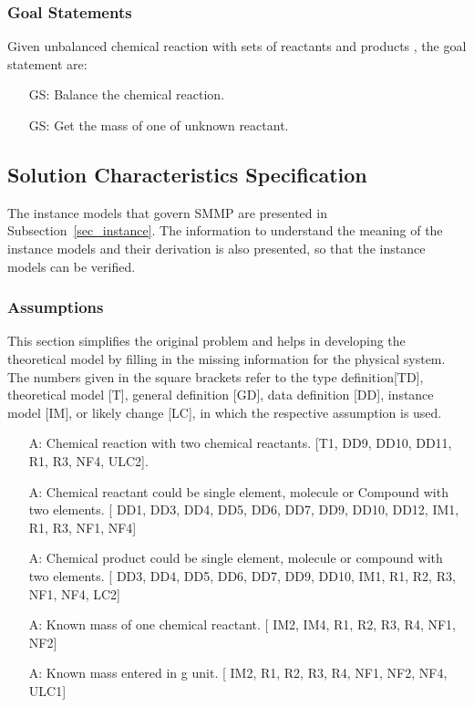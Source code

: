 \documentclass[12pt]{article}
\newcounter{assumpnum} %
\newcounter{goalnum} %
\begin{document}
\subsubsection{Goal Statements}\label{goals}

\noindent Given unbalanced chemical reaction with sets of reactants and products , the goal statement are:

\begin{itemize}
\item[GS\refstepcounter{goalnum}\thegoalnum \label{G1}:] Balance the chemical reaction.
\item[GS\refstepcounter{goalnum}\thegoalnum \label{G2}:] Get the mass of one of unknown reactant.
\end{itemize}

\subsection{Solution Characteristics Specification}


The instance models that govern SMMP are presented in
Subsection~\ref{sec_instance}.  The information to understand the meaning of the
instance models and their derivation is also presented, so that the instance
models can be verified.

\subsubsection{Assumptions} \label{sec_assumpt}

This section simplifies the original problem and helps in developing the
theoretical model by filling in the missing information for the physical
system. The numbers given in the square brackets refer to the  type definition[TD], theoretical model
[T], general definition [GD], data definition [DD], instance model [IM], or
likely change [LC], in which the respective assumption is used.

\begin{itemize}

\item[A\refstepcounter{assumpnum}\theassumpnum \label{Two reactants}:] Chemical reaction with two chemical reactants.  
[T1, DD9, DD10, DD11, R1, R3, NF4, ULC2].
\item[A\refstepcounter{assumpnum}\theassumpnum \label{reactant compound}:] Chemical reactant could be single element, 
molecule or Compound with two elements. [ DD1, DD3, DD4, DD5, DD6, DD7, DD9, DD10, DD12, IM1, R1, R3, NF1, NF4]
\item[A\refstepcounter{assumpnum}\theassumpnum \label{product compound}:] Chemical product could be single element, 
molecule or compound with two elements. [ DD3, DD4, DD5, DD6, DD7, DD9, DD10, IM1, R1, R2, R3, NF1, NF4, LC2]
\item[A\refstepcounter{assumpnum}\theassumpnum \label{Known mass}:] Known mass of one chemical reactant.
[ IM2, IM4, R1, R2, R3, R4, NF1, NF2]
\item[A\refstepcounter{assumpnum}\theassumpnum \label{Mass unit}:] Known mass entered in g unit. 
[ IM2, R1, R2, R3, R4, NF1, NF2, NF4, ULC1]\end{itemize}
\end{document}
